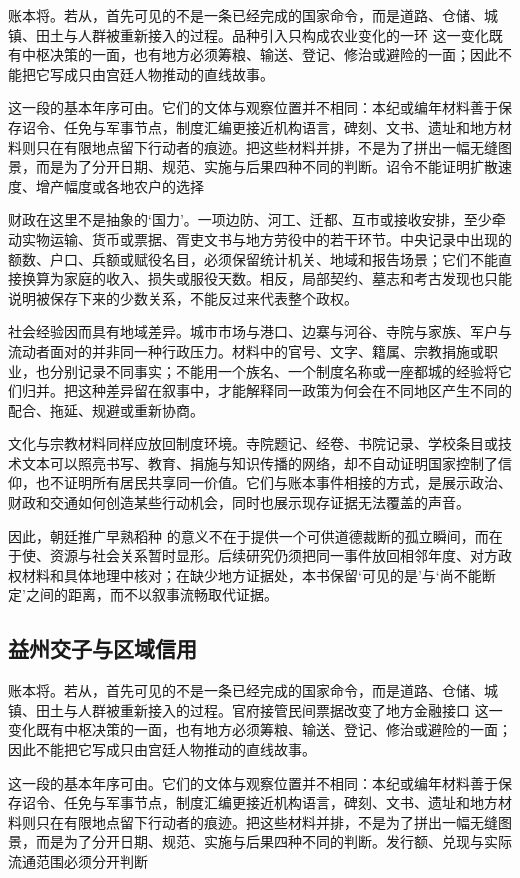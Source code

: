 账本将。若从，首先可见的不是一条已经完成的国家命令，而是道路、仓储、城镇、田土与人群被重新接入的过程。品种引入只构成农业变化的一环 这一变化既有中枢决策的一面，也有地方必须筹粮、输送、登记、修治或避险的一面；因此不能把它写成只由宫廷人物推动的直线故事。

这一段的基本年序可由。它们的文体与观察位置并不相同：本纪或编年材料善于保存诏令、任免与军事节点，制度汇编更接近机构语言，碑刻、文书、遗址和地方材料则只在有限地点留下行动者的痕迹。把这些材料并排，不是为了拼出一幅无缝图景，而是为了分开日期、规范、实施与后果四种不同的判断。诏令不能证明扩散速度、增产幅度或各地农户的选择

财政在这里不是抽象的‘国力’。一项边防、河工、迁都、互市或接收安排，至少牵动实物运输、货币或票据、胥吏文书与地方劳役中的若干环节。中央记录中出现的额数、户口、兵额或赋役名目，必须保留统计机关、地域和报告场景；它们不能直接换算为家庭的收入、损失或服役天数。相反，局部契约、墓志和考古发现也只能说明被保存下来的少数关系，不能反过来代表整个政权。

社会经验因而具有地域差异。城市市场与港口、边寨与河谷、寺院与家族、军户与流动者面对的并非同一种行政压力。材料中的官号、文字、籍属、宗教捐施或职业，也分别记录不同事实；不能用一个族名、一个制度名称或一座都城的经验将它们归并。把这种差异留在叙事中，才能解释同一政策为何会在不同地区产生不同的配合、拖延、规避或重新协商。

文化与宗教材料同样应放回制度环境。寺院题记、经卷、书院记录、学校条目或技术文本可以照亮书写、教育、捐施与知识传播的网络，却不自动证明国家控制了信仰，也不证明所有居民共享同一价值。它们与账本事件相接的方式，是展示政治、财政和交通如何创造某些行动机会，同时也展示现存证据无法覆盖的声音。

因此，朝廷推广早熟稻种 的意义不在于提供一个可供道德裁断的孤立瞬间，而在于使、资源与社会关系暂时显形。后续研究仍须把同一事件放回相邻年度、对方政权材料和具体地理中核对；在缺少地方证据处，本书保留‘可见的是’与‘尚不能断定’之间的距离，而不以叙事流畅取代证据。

\subsection{益州交子与区域信用}

账本将。若从，首先可见的不是一条已经完成的国家命令，而是道路、仓储、城镇、田土与人群被重新接入的过程。官府接管民间票据改变了地方金融接口 这一变化既有中枢决策的一面，也有地方必须筹粮、输送、登记、修治或避险的一面；因此不能把它写成只由宫廷人物推动的直线故事。

这一段的基本年序可由。它们的文体与观察位置并不相同：本纪或编年材料善于保存诏令、任免与军事节点，制度汇编更接近机构语言，碑刻、文书、遗址和地方材料则只在有限地点留下行动者的痕迹。把这些材料并排，不是为了拼出一幅无缝图景，而是为了分开日期、规范、实施与后果四种不同的判断。发行额、兑现与实际流通范围必须分开判断

